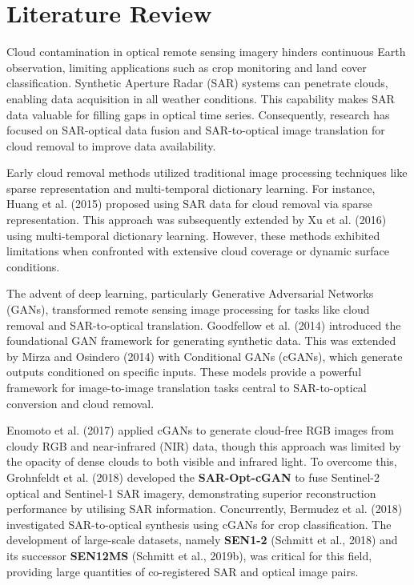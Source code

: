 \chapter{Literature Review}


Cloud contamination in optical remote sensing imagery hinders continuous Earth observation, limiting applications such as crop monitoring and land cover classification. Synthetic Aperture Radar (SAR) systems can penetrate clouds, enabling data acquisition in all weather conditions. This capability makes SAR data valuable for filling gaps in optical time series. Consequently, research has focused on SAR-optical data fusion and SAR-to-optical image translation for cloud removal to improve data availability.

Early cloud removal methods utilized traditional image processing techniques like sparse representation and multi-temporal dictionary learning. For instance, Huang et al. (2015) proposed using SAR data for cloud removal via sparse representation. This approach was subsequently extended by Xu et al. (2016) using multi-temporal dictionary learning. However, these methods exhibited limitations when confronted with extensive cloud coverage or dynamic surface conditions.

The advent of deep learning, particularly Generative Adversarial Networks (GANs), transformed remote sensing image processing for tasks like cloud removal and SAR-to-optical translation. Goodfellow et al. (2014) introduced the foundational GAN framework for generating synthetic data. This was extended by Mirza and Osindero (2014) with Conditional GANs (cGANs), which generate outputs conditioned on specific inputs. These models provide a powerful framework for image-to-image translation tasks central to SAR-to-optical conversion and cloud removal.

Enomoto et al. (2017) applied cGANs to generate cloud-free RGB images from cloudy RGB and near-infrared (NIR) data, though this approach was limited by the opacity of dense clouds to both visible and infrared light. To overcome this, Grohnfeldt et al. (2018) developed the \textbf{SAR-Opt-cGAN} to fuse Sentinel-2 optical and Sentinel-1 SAR imagery, demonstrating superior reconstruction performance by utilising SAR information. Concurrently, Bermudez et al. (2018) investigated SAR-to-optical synthesis using cGANs for crop classification. The development of large-scale datasets, namely \textbf{SEN1-2} (Schmitt et al., 2018) and its successor \textbf{SEN12MS} (Schmitt et al., 2019b), was critical for this field, providing large quantities of co-registered SAR and optical image pairs.

